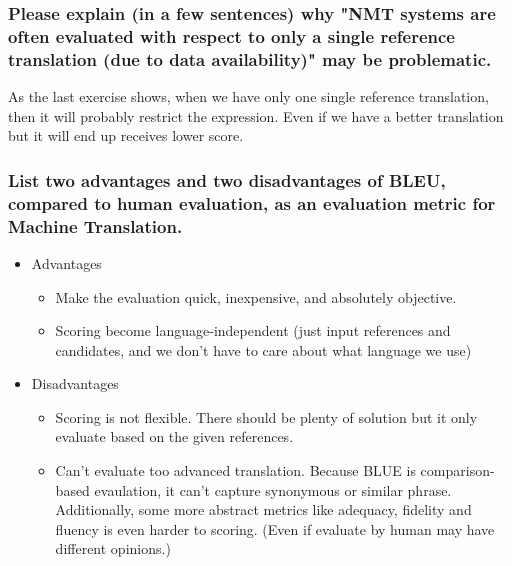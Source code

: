 \documentclass[12pt, letterpaper]{article}
\begin{document}
\subsubsection{Please explain (in a few sentences) why "NMT systems are often evaluated with respect to only a single reference translation (due to data availability)" may be problematic.}

As the last exercise shows, when we have only one single reference translation, then it will probably restrict the expression. Even if we have a better translation but it will end up receives lower score.

\subsubsection{List two advantages and two disadvantages of BLEU, compared to human evaluation, as an evaluation metric for Machine Translation.}

\begin{itemize}[topsep=0pt, partopsep=0pt]
  \item Advantages {
    \begin{itemize}
      \item Make the evaluation quick, inexpensive, and absolutely objective.
      \item Scoring become language-independent (just input references and candidates, and we don't have to care about what language we use)
    \end{itemize}
  }
  \item Disadvantages {
    \begin{itemize}
      \item Scoring is not flexible. There should be plenty of solution but it only evaluate based on the given references.
      \item Can't evaluate too advanced translation. Because BLUE is comparison-based evaulation, it can't capture synonymous or similar phrase. Additionally, some more abstract metrics like adequacy, fidelity and fluency is even harder to scoring. (Even if evaluate by human may have different opinions.)
    \end{itemize}
  }
\end{itemize}
\end{document}
